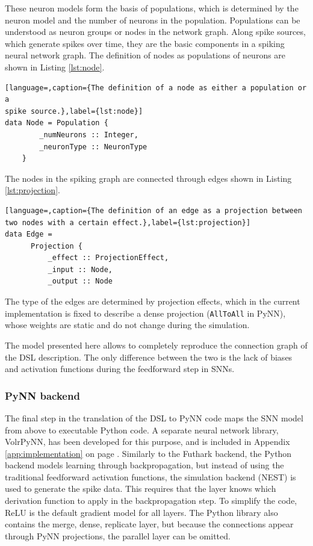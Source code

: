 These neuron models form the basis of populations, which is determined by the
neuron model and the number of neurons in the population.
Populations can be understood as neuron groups or nodes in the network graph.
Along spike sources, which generate spikes over time, they are the 
basic components in a spiking neural network graph.
The definition of nodes as populations of neurons are shown in
Listing \ref{lst:node}.

\begin{lstlisting}[language=,caption={The definition of a node as either a population or a
spike source.},label={lst:node}]
data Node = Population {
        _numNeurons :: Integer,
        _neuronType :: NeuronType
    }
\end{lstlisting}

The nodes in the spiking graph are connected through edges shown in 
Listing \ref{lst:projection}.

\begin{lstlisting}[language=,caption={The definition of an edge as a projection between
two nodes with a certain effect.},label={lst:projection}]
data Edge =
      Projection {
          _effect :: ProjectionEffect,
          _input :: Node,
          _output :: Node
\end{lstlisting}

The type of the edges are determined by projection effects, which
in the current implementation is fixed to describe a 
dense projection (\texttt{AllToAll} in PyNN), whose weights are static and
do not change during the simulation.

The model presented here allows to completely reproduce the connection
graph of the \gls{DSL} description.
The only difference between the two is the lack of biases and activation functions
during the feedforward step in \glspl{SNN}.

\subsubsection{PyNN backend}
The final step in the translation of the \gls{DSL} to PyNN code maps the
\gls{SNN} model from above to executable Python code.
A separate neural network library, VolrPyNN, has been developed for this purpose, and is included in Appendix \ref{app:implementation} on page
\pageref{app:implementation_volrpynn}.
Similarly to the Futhark backend, the Python backend models learning through
backpropagation, but instead of using the traditional feedforward activation
functions, the simulation backend (NEST) is used to generate the spike data.
This requires that the layer knows which derivation function to apply in
the backpropagation step.
To simplify the code, ReLU is the default gradient model for all layers.
The Python library also contains the merge, dense,
replicate layer, but because the connections appear through
PyNN projections, the parallel layer can be omitted.


